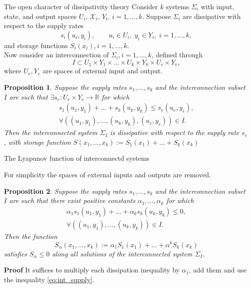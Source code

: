\documentclass[aspectratio=169]{beamer}
\newcommand{\bbR}{\mathbb{R}}
\newtheorem{proposition}{Proposition}
\begin{document}
\begin{frame}{The open character of dissipativity theory}
	Consider $k$ systems $\Sigma_i$  with input, state, and output spaces
	$U_i ,\, \mathcal{X}_i,\, Y_i,\,  i = 1, \dots, k$. Suppose $\Sigma_i$ are dissipative with respect to the supply rates 
	$$s_i(u_i ,y_i), \qquad u_i \in U_i, \; y_i \in Y_i,\;  i = 1, \dots, k,$$
	and storage functions $S_i(x_i), i = 1, \dots, k.$ \\
	Now consider an interconnection of $\Sigma_i, i = 1, \dots, k$, defined through
	\begin{equation*}
		I \subset U_1 \times Y_1 \times \dots \times U_k \times Y_k \times U_e \times Y_e,
	\end{equation*}
	where $U_e , Y_e$ are spaces of external input and output. 
	\begin{proposition}
		Suppose the supply rates $s_1, \dots, s_k$ and the interconnection subset $I$ are such that $\exists s_e : U_e \times Y_e \rightarrow \bbR$ for which
		\begin{equation*}
			\begin{aligned}
				s_1 (u_1, y_1) + \dots + s_k(u_k , y_k) \le s_e(u_e ,y_e), \\
				\forall ((u_1 , y_1 ), \dots, (u_k , y_k), (u_e , y_e)) \in I.
			\end{aligned}
		\end{equation*}
		Then the interconnected system $\Sigma_I$ is dissipative with respect to the supply rate $s_e$,
		with storage function $S(x_1 ,\dots, x_k) := S_1(x_1) + \dots + S_k(x_k)$
	\end{proposition}
	

\end{frame}

\begin{frame}{The Lyapunov function of interconnectd systems}
	
	For simplicity the spaces of external inputs and outputs are removed.	
	\begin{proposition}
		Suppose the supply rates $s_1, \dots, s_k$ and the interconnection subset $I$ are such that there exist positive constants $\alpha_1, \dots, \alpha_k$ for which
		\begin{equation}\label{eq:int_supply}
			\begin{aligned}
				\alpha_1 s_1 (u_1, y_1) + \dots + \alpha_k s_k(u_k , y_k) \le 0, \\
				\forall ((u_1 , y_1 ), \dots, (u_k , y_k)) \in I.
			\end{aligned}
		\end{equation}
	Then the function
	\begin{equation*}
		S_\alpha(x_1 , \dots, x_k) := \alpha_1 S_1(x_1) + \dots + \alpha^k S_k(x_k)
	\end{equation*}
	satisfies $\dot{S}_\alpha \le 0$ along all solutions of the interconnected system $\Sigma_I$.
	\end{proposition}
	\textbf{Proof} It suffices to multiply each dissipation inequality by  $\alpha_1$, add them and use the inequality \eqref{eq:int_supply}.
\end{frame}
\end{document}
